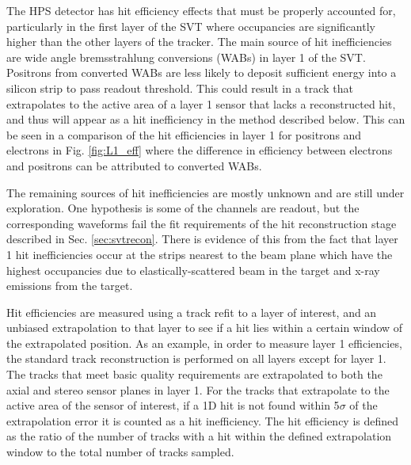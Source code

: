 
The HPS detector has hit efficiency effects that must be properly accounted for, particularly in the first layer of the SVT where occupancies are significantly higher than the other layers of the tracker. The main source of hit inefficiencies are wide angle bremsstrahlung conversions (WABs) in layer 1 of the SVT. Positrons from converted WABs are less likely to deposit sufficient energy into a silicon strip to pass readout threshold. This could result in a track that extrapolates to the active area of a layer 1 sensor that lacks a reconstructed hit, and thus will appear as a hit inefficiency in the method described below. This can be seen in a comparison of the hit efficiencies in layer 1 for positrons and electrons in Fig. \ref{fig:L1_eff} where the difference in efficiency between electrons and positrons can be attributed to converted WABs. 

The remaining sources of hit inefficiencies are mostly unknown and are still under exploration. One hypothesis is some of the channels are readout, but the corresponding waveforms fail the fit requirements of the hit reconstruction stage described in Sec. \ref{sec:svtrecon}. There is evidence of this from the fact that layer 1 hit inefficiencies occur at the strips nearest to the beam plane which have the highest occupancies due to elastically-scattered beam in the target and x-ray emissions from the target.

Hit efficiencies are measured using a track refit to a layer of interest, and an unbiased extrapolation to that layer to see if a hit lies within a certain window of the extrapolated position. As an example, in order to measure layer 1 efficiencies, the standard track reconstruction is performed on all layers except for layer 1. The tracks that meet basic quality requirements are extrapolated to both the axial and stereo sensor planes in layer 1. For the tracks that extrapolate to the active area of the sensor of interest, if a 1D hit is not found within 5$\sigma$ of the extrapolation error it is counted as a hit inefficiency. The hit efficiency is defined as the ratio of the number of tracks with a hit within the defined extrapolation window to the total number of tracks sampled.  

